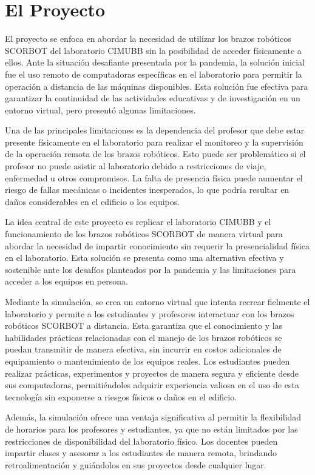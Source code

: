 \section{El Proyecto}
El proyecto se enfoca en abordar la necesidad de utilizar los brazos robóticos SCORBOT del laboratorio CIMUBB sin la posibilidad de acceder físicamente a ellos. Ante la situación desafiante presentada por la pandemia, la solución inicial fue el uso remoto de computadoras específicas en el laboratorio para permitir la operación a distancia de las máquinas disponibles. Esta solución fue efectiva para garantizar la continuidad de las actividades educativas y de investigación en un entorno virtual, pero presentó algunas limitaciones.

Una de las principales limitaciones es la dependencia del profesor que debe estar presente físicamente en el laboratorio para realizar el monitoreo y la supervisión de la operación remota de los brazos robóticos. Esto puede ser problemático si el profesor no puede asistir al laboratorio debido a restricciones de viaje, enfermedad u otros compromisos. La falta de presencia física puede aumentar el riesgo de fallas mecánicas o incidentes inesperados, lo que podría resultar en daños considerables en el edificio o los equipos.

La idea central de este proyecto es replicar el laboratorio CIMUBB y el funcionamiento de los brazos robóticos SCORBOT de manera virtual para abordar la necesidad de impartir conocimiento sin requerir la presencialidad física en el laboratorio. Esta solución se presenta como una alternativa efectiva y sostenible ante los desafíos planteados por la pandemia y las limitaciones para acceder a los equipos en persona.

Mediante la simulación, se crea un entorno virtual que intenta recrear fielmente el laboratorio y permite a los estudiantes y profesores interactuar con los brazos robóticos SCORBOT a distancia. Esta garantiza que el conocimiento y las habilidades prácticas relacionadas con el manejo de los brazos robóticos se puedan transmitir de manera efectiva, sin incurrir en costos adicionales de equipamiento o mantenimiento de los equipos reales. Los estudiantes pueden realizar prácticas, experimentos y proyectos de manera segura y eficiente desde sus computadoras, permitiéndoles adquirir experiencia valiosa en el uso de esta tecnología sin exponerse a riesgos físicos o daños en el edificio.

Además, la simulación ofrece una ventaja significativa al permitir la flexibilidad de horarios para los profesores y estudiantes, ya que no están limitados por las restricciones de disponibilidad del laboratorio físico. Los docentes pueden impartir clases y asesorar a los estudiantes de manera remota, brindando retroalimentación y guiándolos en sus proyectos desde cualquier lugar.

